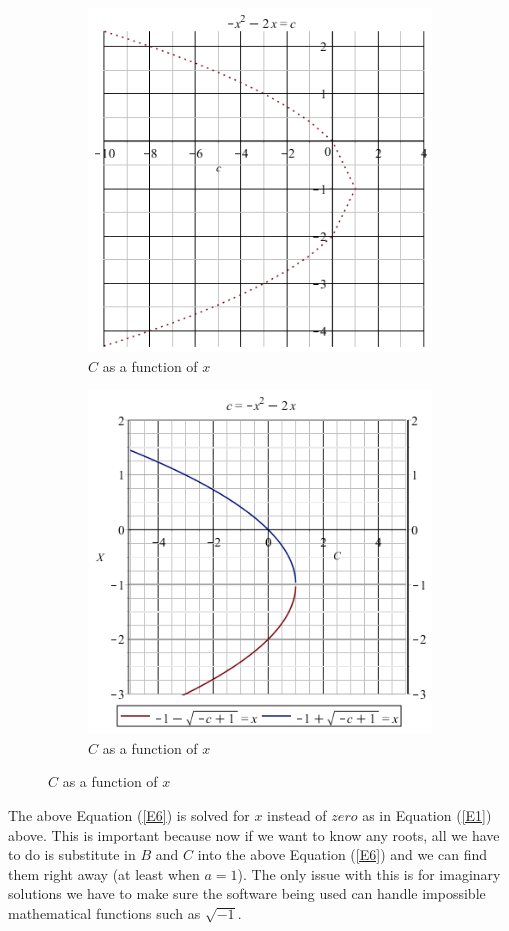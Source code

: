 \documentclass[14pt]{extarticle}
\begin{document}
\begin{figure}[h]
\begin{subfigure}{0.50\textwidth}
\includegraphics[scale=0.58]{graph10.png}
\caption{\small$C$ as a function of $x$}
\label{fig:img10}
\end{subfigure}
\begin{subfigure}{0.50\textwidth}
\includegraphics[scale=0.58]{graph4.png}
\caption{\small$C$ as a function of $x$}
\label{fig:img4}
\end{subfigure}
\end{figure}

\normalsize
\indent The above Equation (\ref{E6}) is solved for $x$ instead of $zero$ as in Equation (\ref{E1}) above. This is important because now if we want to know any roots, all we have to do is substitute in $B$ and $C$ into the above Equation (\ref{E6}) and we can find them right away (at least when $a=1$). The only issue with this is for imaginary solutions we have to make sure the software being used can handle impossible mathematical functions such as $\sqrt{-1}$.
\end{document}
